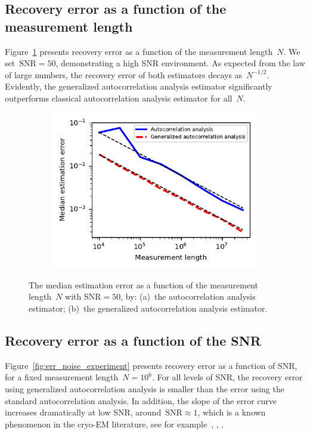 \documentclass{article}
\newcommand{\rev}[1]{{\color{magenta}{#1}}}
\begin{document}
\subsection{Recovery error as a function of the measurement length}
\label{subsec:exp_size}
Figure~\ref{fig:err_size_experiment} presents recovery error as a function of the measurement length~$N$. We set~\mbox{$\text{SNR} = 50$}, demonstrating a high SNR environment. As expected from the law of large numbers, the recovery error of both estimators decays as~$N^{-1/2}$. Evidently, the generalized autocorrelation analysis estimator significantly outperforms \rev{the} classical autocorrelation analysis estimator for all~$N$.

\begin{figure}[!tb]
	\begin{subfigure}[ht]{\columnwidth}
		\centering
		\includegraphics[width=0.95\columnwidth, keepaspectratio]{figures/experiment_size_err.pdf}
	\end{subfigure}
	\caption{The median estimation error as a function of the measurement length~$N$ with $\text{SNR}=50$, by: (a)~the autocorrelation analysis estimator; (b)~the generalized autocorrelation analysis estimator. \rev{The black dashed lines illustrates a slope of~$-1/2$, as predicted by the law of large numbers.}}
\label{fig:err_size_experiment}
\end{figure}

\subsection{Recovery error as a function of the SNR}
\label{subsec:exp_SNR}
Figure~\ref{fig:err_noise_experiment} presents recovery error as a function of \rev{the} SNR, for a fixed measurement length~$N = 10^6$. For all levels of SNR, the recovery error using  generalized autocorrelation analysis  is smaller than the error using the standard autocorrelation analysis. In addition, the slope of the error curve increases dramatically at low SNR, around~\mbox{$\text{SNR} \approx 1$}, which is a known phenomenon in the \mbox{cryo-EM} literature, see for example~\cite{sigworth1998maximum}, \cite{abbe2018multireference}, \cite{perry2019sample}.
\end{document}

